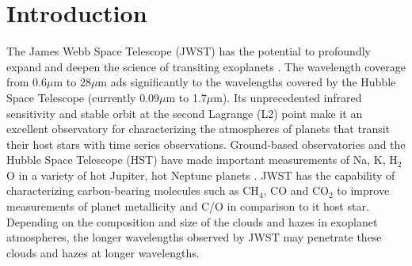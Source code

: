 \documentclass{emulateapj}
\begin{document}

\section{Introduction}

The James Webb Space Telescope (JWST) \citep[e.g.][]{gardner2006SSRv} has the potential to profoundly expand and deepen the science of transiting exoplanets \citep[e.g.][]{greene2016jwst_trans}. The wavelength coverage from 0.6$\mu$m to 28$\mu$m ads significantly to the wavelengths covered by the Hubble Space Telescope (currently 0.09$\mu$m to 1.7$\mu$m). Its unprecedented infrared sensitivity and stable orbit at the second Lagrange (L2) point make it an excellent observatory for characterizing the atmospheres of planets that transit their host stars with time series observations. Ground-based observatories and the Hubble Space Telescope (HST) have made important measurements of Na, K, H$_2$O in a variety of hot Jupiter, hot Neptune planets \cite[e.g.][]{snellen2008Na209,kreidberg2014wasp43,fraine2014hatp11,deming13,sing2016continuum}. JWST has the capability of characterizing carbon-bearing molecules such as CH$_4$, CO and CO$_2$ to improve measurements of planet metallicity and C/O in comparison to it host star. Depending on the composition and size of the clouds and hazes in exoplanet atmospheres, the longer wavelengths observed by JWST may penetrate these clouds and hazes at longer wavelengths.
\end{document}
